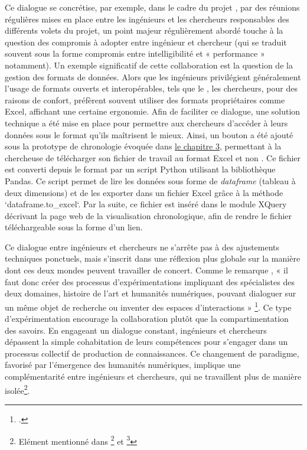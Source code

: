 Ce dialogue se concrétise, par exemple, dans le cadre du projet \pense, par des réunions régulières mises en place entre les ingénieurs et les chercheurs responsables des différents volets du projet, un point majeur régulièrement abordé touche à la question des compromis à adopter entre ingénieur et chercheur (qui se traduit souvent sous la forme compromis entre intelligibilité et « performance » notamment). Un exemple significatif de cette collaboration est la question de la gestion des formats de données. Alors que les ingénieurs privilégient généralement l’usage de formats ouverts et interopérables, tels que le \csv, les chercheurs, pour des raisons de confort, préfèrent souvent utiliser des formats propriétaires comme Excel, affichant une certaine ergonomie. Afin de faciliter ce dialogue, une solution technique a été mise en place pour permettre aux chercheurs d’accéder à leurs données sous le format qu’ils maîtrisent le mieux. Ainsi, un bouton a été ajouté sous la prototype de chronologie évoquée dans \hyperlink{chap3}{le chapitre 3}, permettant à la chercheuse de télécharger son fichier de travail au format Excel et non \csv. Ce fichier est converti depuis le format \csv par un script Python utilisant la bibliothèque Pandas. Ce script permet de lire les données sous forme de \textit{dataframe} (tableau à deux dimensions) et de les exporter dans un fichier Excel grâce à la méthode `dataframe.to\_excel`. Par la suite, ce fichier est inséré dans le module XQuery décrivant la page web de la visualisation chronologique, afin de rendre le fichier téléchargeable sous la forme d’un lien.

Ce dialogue entre ingénieurs et chercheurs ne s’arrête pas à des ajustements techniques ponctuels, mais s’inscrit dans une réflexion plus globale sur la manière dont ces deux mondes peuvent travailler de concert. Comme le remarque \citeauthor{bonfait_humanites_2021}, « il faut donc créer des processus d’expérimentations impliquant des spécialistes des deux domaines, histoire de l’art et humanités numériques, pouvant dialoguer sur un même objet de recherche ou inventer des espaces d’interactions » \footcite[p.8]{bonfait_humanites_2021}. Ce type d’expérimentation encourage la collaboration plutôt que la compartimentation des savoirs. En engageant un dialogue constant, ingénieurs et chercheurs dépassent la simple cohabitation de leurs compétences pour s’engager dans un processus collectif de production de connaissances. Ce changement de paradigme, favorisé par l’émergence des humanités numériques, implique une complémentarité entre ingénieurs et chercheurs, qui ne travaillent plus de manière isolée\footnote{Elément mentionné dans \footcite[p.3]{massot_dessiner_2018} et \footcite[p.172]{pelissier_accompagner_2017}}.     

